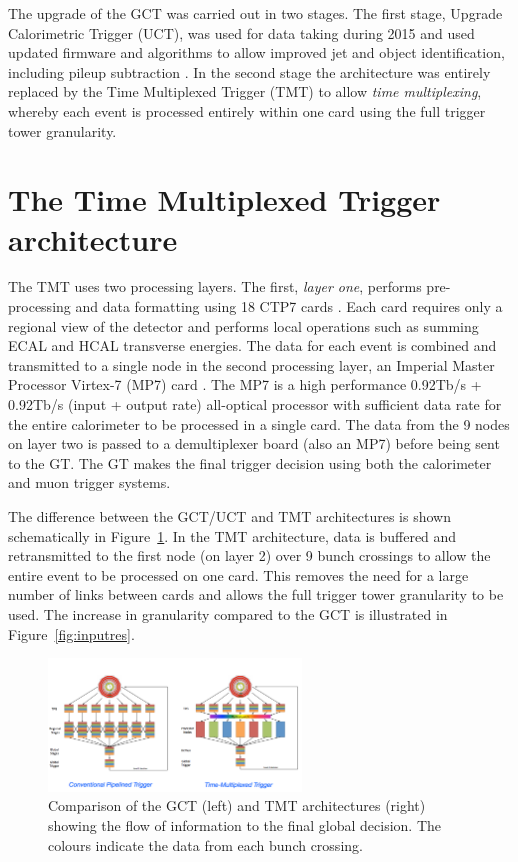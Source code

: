The upgrade of the GCT was carried out in two stages. The first stage,
Upgrade Calorimetric Trigger (UCT), was used for data taking during 2015
and used updated firmware and algorithms to allow improved jet and object 
identification, including pileup subtraction \cite{uct}. In the second stage the 
architecture was entirely replaced by the Time Multiplexed Trigger (TMT) 
to allow \emph{time multiplexing}, whereby each
event is processed entirely within one card using the full trigger tower granularity. 

\section{The Time Multiplexed Trigger architecture}

The TMT uses two processing layers. The first, \emph{layer one}, performs
pre-processing and data formatting using 18 CTP7 cards \cite{mp7}. Each card requires
only a regional view of the detector and performs local operations such as summing 
ECAL and HCAL transverse energies. The data for each event is combined and transmitted to 
a single node in the second processing layer, an Imperial Master Processor Virtex-7 (MP7) card \cite{mp7}. 
The MP7 is a high performance 0.92Tb/s + 0.92Tb/s (input + output rate) all-optical processor 
with sufficient data rate for the entire calorimeter to be processed in a single card. The data 
from the 9 nodes on layer two is passed to a demultiplexer board (also an MP7) before
being sent to the GT. The GT makes the final trigger decision using both the calorimeter
and muon trigger systems.

The difference between the GCT/UCT and TMT architectures is shown schematically in Figure~\ref{tmux}. 
In the TMT architecture, data is buffered and retransmitted to the first node (on layer 2)
over 9 bunch crossings to allow the entire event to be processed on one card. This
removes the need for a large number of links between cards and allows the full trigger
tower granularity to be used. The increase in granularity compared to the GCT is
illustrated in Figure~\ref{fig:inputres}. 

\begin{figure}

\centering
    \includegraphics[width=0.6\textwidth]{./Figures/triggerUpgrade/tmux}
  \caption{Comparison of the GCT (left) and TMT architectures (right) showing the flow of information
  to the final global decision. The colours indicate the data from each bunch crossing. \cite{tmt}}
  \label{tmux}
\end{figure}


